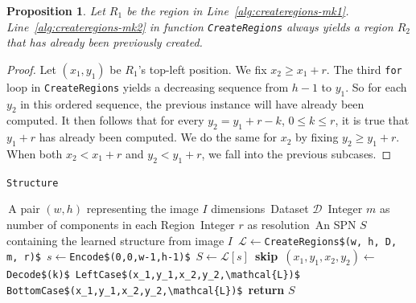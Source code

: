 \documentclass{amsart}
\theoremstyle{plain}
\newcounter{dummy-def}\numberwithin{dummy-def}{section}
\newcounter{dummy-thm}\numberwithin{dummy-thm}{section}
\newcounter{dummy-prop}\numberwithin{dummy-prop}{section}
\newtheorem{proposition}[dummy-prop]{Proposition}
\newcounter{dummy-corollary}\numberwithin{dummy-corollary}{section}
\newcounter{dummy-lemma}\numberwithin{dummy-lemma}{section}
\newcounter{dummy-ex}\numberwithin{dummy-ex}{section}
\newcounter{dummy-eg}\numberwithin{dummy-eg}{section}
\numberwithin{equation}{section}
\newcommand{\code}[1]{\lstinline[mathescape=true]{#1}}
\newcommand{\mcode}[1]{\lstinline[mathescape]!#1!}
\begin{document}
\begin{proposition} Let $R_1$ be the region in Line~\ref{alg:createregions-mk1}.
  Line~\ref{alg:createregions-mk2} in function \code{CreateRegions} always yields
  a region $R_2$ that has already been previously created.
\end{proposition}
\begin{proof}
  Let $(x_1,y_1)$ be $R_1$'s top-left position. We fix $x_2\geq x_1+r$. The third \code{for} loop
  in \code{CreateRegions} yields a decreasing sequence from $h-1$ to $y_1$. So for each $y_2$ in
  this ordered sequence, the previous instance will have already been computed. It then follows
  that for every $y_2=y_1+r-k$, $0\leq k\leq r$, it is true that $y_1+r$ has already been computed.
  We do the same for $x_2$ by fixing $y_2\geq y_1+r$. When both $x_2<x_1+r$ and $y_2<y_1+r$, we
  fall into the previous subcases.
\end{proof}

\begin{algorithm}[h]
  \caption{\code{Structure}}\label{alg:structure}
  \begin{algorithmic}[1]
    \Require\,A pair $(w,h)$ representing the image $I$ dimensions
    \Require\,Dataset $\mathcal{D}$
    \Require\,Integer $m$ as number of components in each Region
    \Require\,Integer $r$ as resolution
    \Ensure\,An SPN $S$ containing the learned structure from image $I$
    \State\,$\mathcal{L}\gets$\mcode{CreateRegions$(w, h, D, m, r)$}
    \State\,$s\gets$\mcode{Encode$(0,0,w-1,h-1)$}
    \State\,$S\gets\mathcal{L}[s]$
        \State\,\textbf{skip}
      \EndIf%
      \State\,$(x_1,y_1,x_2,y_2)\gets$ \mcode{Decode$(k)$}
      \State\,\mcode{LeftCase$(x_1,y_1,x_2,y_2,\mathcal{L})$}
      \State\,\mcode{BottomCase$(x_1,y_1,x_2,y_2,\mathcal{L})$}
    \EndFor%
    \State\,\textbf{return} $S$
  \end{algorithmic}
\end{algorithm}


\printbibliography[]
\end{document}
